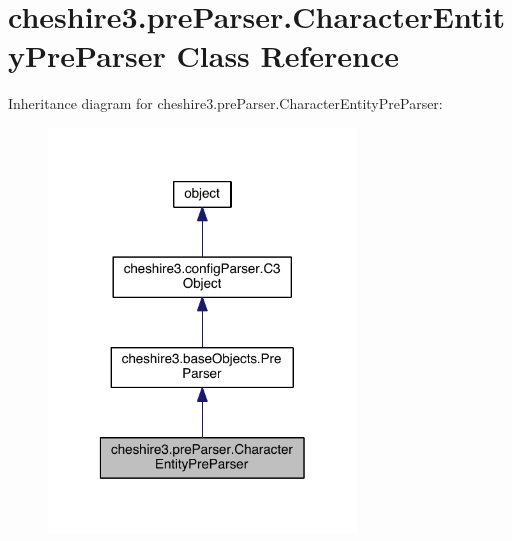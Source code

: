 \hypertarget{classcheshire3_1_1pre_parser_1_1_character_entity_pre_parser}{\section{cheshire3.\-pre\-Parser.\-Character\-Entity\-Pre\-Parser Class Reference}
\label{classcheshire3_1_1pre_parser_1_1_character_entity_pre_parser}
}


Inheritance diagram for cheshire3.\-pre\-Parser.\-Character\-Entity\-Pre\-Parser\-:
\nopagebreak
\begin{figure}[H]
\begin{center}
\leavevmode
\includegraphics[width=232pt]{classcheshire3_1_1pre_parser_1_1_character_entity_pre_parser__inherit__graph}
\end{center}
\end{figure}



